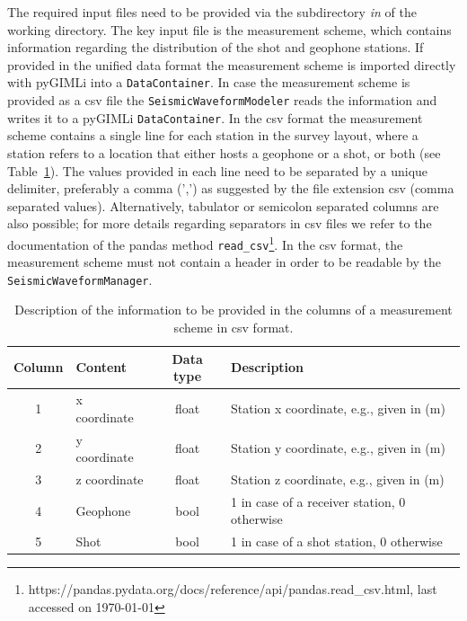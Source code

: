 \documentclass[a4paper,fleqn]{cas-sc}
\begin{document}
The required input files need to be provided via the subdirectory \textit{in} of the working directory. The key input file is the measurement scheme, which contains information regarding the distribution of the shot and geophone stations. If provided in the unified data format the measurement scheme is imported directly with pyGIMLi into a \texttt{DataContainer}. In case the measurement scheme is provided as a csv file the \texttt{SeismicWaveformModeler} reads the information and writes it to a pyGIMLi \texttt{DataContainer}. In the csv format the measurement scheme contains a single line for each station in the survey layout, where a station refers to a location that either hosts a geophone or a shot, or both (see Table~\ref{tab:scheme}). The values provided in each line need to be separated by a unique delimiter, preferably a comma (',') as suggested by the file extension csv (comma separated values). Alternatively, tabulator or semicolon separated columns are also possible; for more details regarding separators in csv files we refer to the documentation of the pandas method \texttt{read\_csv}\footnote{https://pandas.pydata.org/docs/reference/api/pandas.read\_csv.html, last accessed on \today}. In the csv format, the measurement scheme must not contain a header in order to be readable by the \texttt{SeismicWaveformManager}.
\begin{table}[]
    \caption{Description of the information to be provided in the columns of a measurement scheme in csv format.}
    \centering
    \begin{tabular}{clcl}
        \toprule
        Column & \textbf{Content} & \textbf{Data type} & \textbf{Description} \\
        \midrule
        1 & x coordinate & float & Station x coordinate, e.g., given in (m) \\ 
        2 & y coordinate & float & Station y coordinate, e.g., given in (m) \\ 
        3 & z coordinate & float & Station z coordinate, e.g., given in (m) \\ 
        4 & Geophone & bool & 1 in case of a receiver station, 0 otherwise \\ 
        5 & Shot & bool & 1 in case of a shot station, 0 otherwise \\
        \bottomrule
    \end{tabular}
    \label{tab:scheme}
\end{table}
\end{document}
